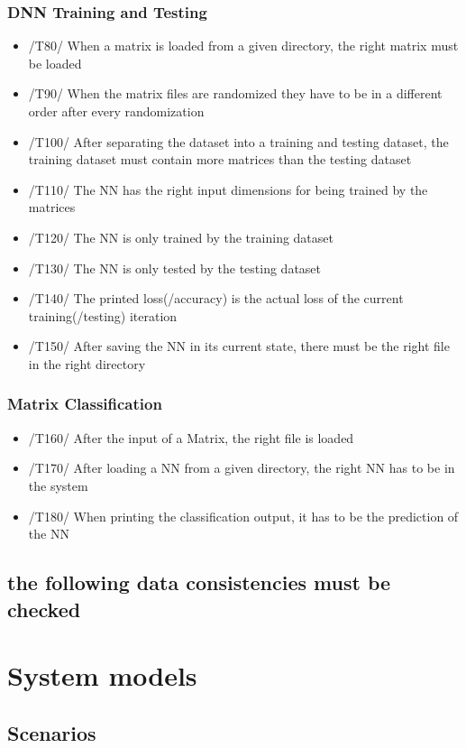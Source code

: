 \documentclass[parskip=full]{scrartcl}
\begin{document}
	\subsubsection{DNN Training and Testing}
		\begin{itemize}
		\item /T80/ When a matrix is loaded from a given directory, the right matrix must be loaded
		\item /T90/ When the matrix files are randomized they have to be in a different order after every randomization
		\item /T100/ After separating the dataset into a training and testing dataset, the training dataset must contain more matrices than the testing dataset
		\item /T110/ The NN has the right input dimensions for being trained by the matrices
		\item /T120/ The NN is only trained by the training dataset
		\item /T130/ The NN is only tested by the testing dataset
		\item /T140/ The printed loss(/accuracy) is the actual loss of the current training(/testing) iteration 
		\item /T150/ After saving the NN in its current state, there must be the right file in the right directory
		\end{itemize}
	\subsubsection{Matrix Classification}
		\begin{itemize}
		\item /T160/ After the input of a Matrix, the right file is loaded
		\item /T170/ After loading a NN from a given directory, the right NN has to be in the system
		\item /T180/ When printing the classification output, it has to be the prediction of the NN
		\end{itemize}
\subsection{the following data consistencies must be checked}
\newpage
\section{System models}
\subsection{Scenarios}
\end{document}
